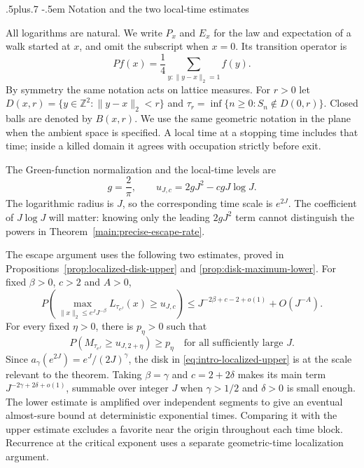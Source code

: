 \documentclass[12pt,reqno]{amsart}
\makeatletter
\def\subsection{\@startsection{subsection}{2}{0pt}%
  {.5\linespacing plus.7\linespacing}
  {-.5em}
  {\normalfont\scshape}}
\theoremstyle{plain}
\theoremstyle{definition}
\theoremstyle{remark}
\numberwithin{equation}{section}
\makeatother
\begin{document}
\subsection{Notation and the two local-time estimates}

All logarithms are natural. We write $P_x$ and $E_x$ for the law and
expectation of a walk started at $x$, and omit the subscript when $x=0$.
Its transition operator is
\[
 Pf(x)=\frac14\sum_{y:\|y-x\|_2=1}f(y).
\]
By symmetry the same notation acts on lattice measures. For $r>0$ let
$D(x,r)=\{y\in\mathbb Z^2:\|y-x\|_2<r\}$ and
$\tau_r=\inf\{n\ge0:S_n\notin D(0,r)\}$. Closed balls are denoted by
$B(x,r)$. We use the same geometric notation in the plane when the ambient
space is specified. A local time at a stopping time includes that time;
inside a killed domain it agrees with occupation strictly before exit.

The Green-function normalization and the local-time levels are
\begin{equation}\label{eq:level-definition}
 g=\frac2\pi,\qquad
 u_{J,c}=2gJ^2-cgJ\log J.
\end{equation}
The logarithmic radius is $J$, so the corresponding time scale is $e^{2J}$.
The coefficient of $J\log J$ will matter: knowing only the leading
$2gJ^2$ term cannot distinguish the powers in
Theorem~\ref{main:precise-escape-rate}.

The escape argument uses the following two estimates, proved in
Propositions~\ref{prop:localized-disk-upper} and
\ref{prop:disk-maximum-lower}. For fixed $\beta>0$, $c>2$ and $A>0$,
\begin{equation}\label{eq:intro-localized-upper}
 P\left(\max_{\|x\|_2\le e^JJ^{-\beta}}
 L_{\tau_{e^J}}(x)\ge u_{J,c}\right)
 \le J^{-2\beta+c-2+o(1)}+O(J^{-A}).
\end{equation}
For every fixed $\eta>0$, there is $p_\eta>0$ such that
\begin{equation}\label{eq:intro-disk-lower}
 P(M_{\tau_{e^J}}\ge u_{J,2+\eta})\ge p_\eta
 \quad\text{for all sufficiently large }J.
\end{equation}
Since $a_\gamma(e^{2J})=e^J/(2J)^\gamma$, the disk in
\eqref{eq:intro-localized-upper} is at the scale relevant to the theorem.
Taking $\beta=\gamma$ and $c=2+2\delta$ makes its main term
$J^{-2\gamma+2\delta+o(1)}$, summable over integer $J$ when
$\gamma>1/2$ and $\delta>0$ is small enough. The lower estimate is
amplified over independent segments to give an eventual almost-sure
bound at deterministic exponential times. Comparing it with the upper
estimate excludes a favorite near the origin throughout each time block.
Recurrence at the critical exponent uses a separate geometric-time
localization argument.
\end{document}
